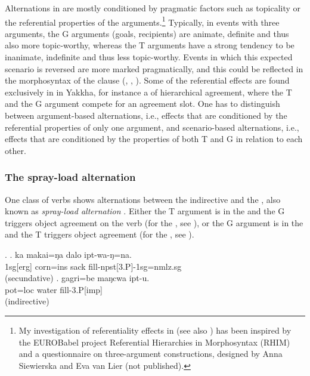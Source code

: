 Alternations in  are mostly conditioned by pragmatic factors such as topicality or the referential properties of the arguments.\footnote{My investigation of referentiality effects in  (see also \citealt{Schackow2012_Referential}) has been inspired by the EUROBabel project Referential Hierarchies in Morphosyntax (RHIM) and a questionnaire on three-argument constructions, designed by Anna Siewierska and Eva van Lier (not published).} Typically, in events with three arguments, the G arguments (goals, recipients) are animate, definite and thus also more topic-worthy, whereas the T arguments have a strong tendency to be inanimate, indefinite and thus less topic-worthy. Events in which this expected scenario is reversed are more marked pragmatically, and this could be reflected in the morphosyntax of the clause (\citealt{Dryer1986Primary, Siewierska2003Person}, \citealt{Haspelmath2004Explaining, Haspelmath2005Argument, Haspelmath2007Ditransitive}, \citealt{Malchukovetal2010Ditrans-overview}). Some of the referential effects are found exclusively in  in Yakkha, for instance a  of hierarchical agreement, where the T and the G argument compete for an agreement slot. One has to distinguish between argument-based alternations, i.e., effects that are conditioned by the referential properties of only one argument, and scenario-based alternations, i.e., effects that are conditioned by the properties of both T and G in relation to each other.


\subsubsection{The spray-load alternation}

One class of verbs shows alternations between the indirective and the , also known as \emph{spray-load alternation} \citep{Levin1993_English, Malchukovetal2010Studies, Malchukovetal2015_Valency}. Either the T argument is in the   and the G  triggers object agreement on the verb (for the , see \Next[a]), or the G argument is in the  and the T triggers object agreement (for the , see \Next[b]). 

	\ex. \ag. ka makai=ŋa dalo ipt-wa-ŋ=na.\\
	{\sc 1sg[erg]} corn{\sc =ins} sack fill{\sc -npst[3.P]-1sg=nmlz.sg}	\\
	  (secundative)
	 \bg. gagri=be maŋcwa ipt-u.\\
	pot{\sc =loc} water fill{\sc -3.P[imp]}\\ 
	   (indirective) 
 
